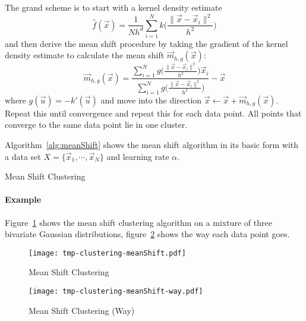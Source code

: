 		The grand scheme is to start with a kernel density estimate
		\begin{equation}
			\hat{f}(\vec{x}) = \frac{1}{Nh^d} \sum_{i = 1}^{N} k\Bigg( \frac{\lVert \vec{x} - \vec{x}_i \rVert^2}{h^2} \Bigg)
		\end{equation}
		and then derive the mean shift procedure by taking the gradient of the kernel density estimate to calculate the mean shift \( \vec{m}_{h, g}(\vec{x}) \):
		\begin{equation}
			\vec{m}_{h, g}(\vec{x}) = \frac{\sum_{i = 1}^{N} g\Big( \frac{\lVert \vec{x} - \vec{x}_i \rVert^2}{h^2} \Big) \vec{x}_i}{\sum_{i = 1}^{N} g\Big( \frac{\lVert \vec{x} - \vec{x}_i \rVert^2}{h^2} \Big)} - \vec{x}
		\end{equation}
		where \( g(\vec{u}) = -k'(\vec{u}) \) and move into the direction \( \vec{x} \gets \vec{x} + \vec{m}_{h, g}(\vec{x}) \). Repeat this until convergence and repeat this for each data point. All points that converge to the same data point lie in one cluster.

		Algorithm~\ref{alg:meanShift} shows the mean shift algorithm in its basic form with a data set \( X = \{ \vec{x}_1, \cdots, \vec{x}_N \} \) and learning rate \(\alpha\).

		\begin{algorithm}

			\caption{Mean Shift Clustering}
			\label{alg:meanShift}
		\end{algorithm}

		\paragraph{Example} 
			Figure~\ref{fig:meanShiftExample} shows the mean shift clustering algorithm on a mixture of three bivariate Gaussian distributions, figure~\ref{fig:meanShiftExampleWay} shows the way each data point goes.

			\begin{figure}
				\centering
				\texttt{[image: tmp-clustering-meanShift.pdf]}
				\caption{Mean Shift Clustering}
				\label{fig:meanShiftExample}
			\end{figure}
			\begin{figure}
				\centering
				\texttt{[image: tmp-clustering-meanShift-way.pdf]}
				\caption{Mean Shift Clustering (Way)}
				\label{fig:meanShiftExampleWay}
			\end{figure}
	
